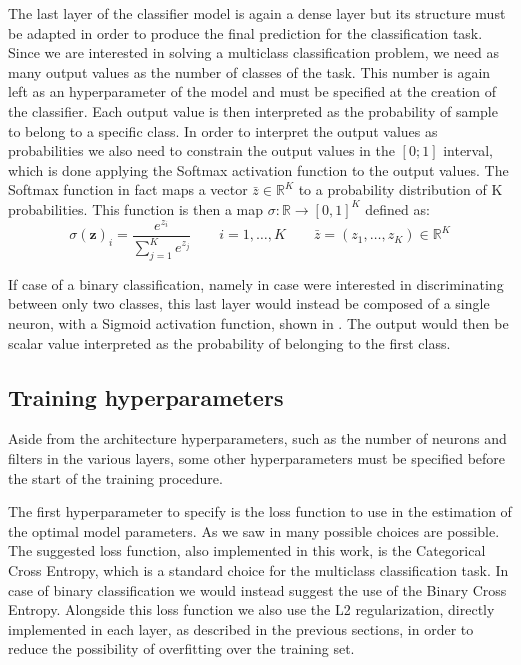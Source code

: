 The last layer of the classifier model is again a dense layer but its structure must be adapted in order to produce the final prediction for the classification task. 
Since we are interested in solving a multiclass classification problem, we need as many output values as the number of classes of the task. This number is again left as an hyperparameter of the model and must be specified at the creation of the classifier. Each output value is then interpreted as the probability of sample to belong to a specific class. In order to interpret the output values as probabilities we also need to constrain the output values in the $[0;1]$ interval, which is done applying the Softmax activation function to the output values. The Softmax function in fact maps a vector $\bar{z}\in \mathbb{R}^K$ to a probability distribution of K probabilities. This function is then a map $\sigma:\mathbb{R}\to[0,1]^K$ defined as:
\begin{equation}
\sigma(\mathbf{z})_{i}=\frac{e^{z_{i}}}{\sum_{j=1}^{K} e^{z_{j}}} \quad \quad i=1, \ldots, K \qquad\bar{z}=\left(z_{1}, \ldots, z_{K}\right) \in \mathbb{R}^{K}
\end{equation} 

If case of a binary classification, namely in case were interested in discriminating between only two classes, this last layer would instead be composed of a single neuron, with a Sigmoid activation function, shown in . The output would then be scalar value interpreted as the probability of belonging to the first class.

\subsection{Training hyperparameters}

Aside from the architecture hyperparameters, such as the number of neurons and filters in the various layers, some other hyperparameters must be specified before the start of the training procedure. 

The first hyperparameter to specify is the loss function to use in the estimation of the optimal model parameters. As we saw in  many possible choices are possible. 
The suggested loss function, also implemented in this work, is the Categorical Cross Entropy,
which is a standard choice for the multiclass classification task. In case of binary classification we would instead suggest the use of the Binary Cross Entropy. Alongside this loss function we also use the L2 regularization, directly implemented in each layer, as described in the previous sections, in order to reduce the possibility of overfitting over the training set.

